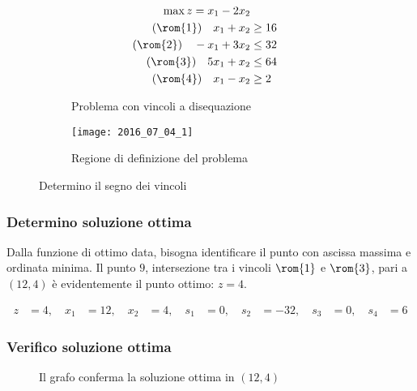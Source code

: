 \documentclass[\main/main.tex]{subfiles}
\begin{document}
\begin{figure}
  \begin{subfigure}{0.49\textwidth}
    \begin{align*}
      \max z = x_1 -2x_2                   \\
      (\rom{1})\quad x_1 + x_2   & \geq 16 \\
      (\rom{2})\quad -x_1 + 3x_2 & \leq 32 \\
      (\rom{3})\quad 5x_1 + x_2  & \leq 64 \\
      (\rom{4})\quad x_1 - x_2   & \geq 2
    \end{align*}
    \caption{Problema con vincoli a disequazione}
  \end{subfigure}
  \begin{subfigure}{0.49\textwidth}
    \texttt{[image: 2016\_07\_04\_1]}
    \caption{Regione di definizione del problema}
  \end{subfigure}
  \caption{Determino il segno dei vincoli}
\end{figure}

\subsubsection*{Determino soluzione ottima}
Dalla funzione di ottimo data, bisogna identificare il punto con ascissa massima e ordinata minima. Il punto $9$, intersezione tra i vincoli $\rom{1}$ e $\rom{3}$, pari a $(12,4)$ è evidentemente il punto ottimo: $z = 4$.

\begin{align*}
  z   & = 4   ,\quad
  x_1 & = 12  ,\quad
  x_2 & = 4   ,\quad
  s_1 & = 0   ,\quad
  s_2 & = -32 ,\quad
  s_3 & = 0   ,\quad
  s_4 & = 6
\end{align*}

\subsubsection*{Verifico soluzione ottima}

\begin{figure}
  \caption{Il grafo conferma la soluzione ottima in $(12,4)$}
\end{figure}
\end{document}

